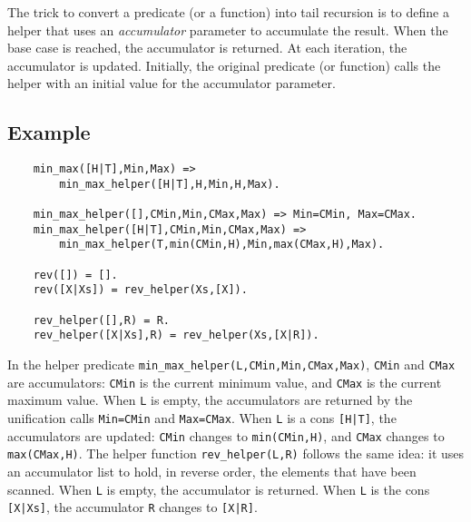 The trick to convert a predicate (or a function) into tail recursion is to define a helper that uses an \emph{accumulator} parameter to accumulate the result. When the base case is reached, the accumulator is returned. At each iteration, the accumulator is updated. Initially, the original predicate (or function) calls the helper with an initial value for the accumulator parameter.


\subsection*{Example}
\begin{verbatim}
    min_max([H|T],Min,Max) => 
        min_max_helper([H|T],H,Min,H,Max).

    min_max_helper([],CMin,Min,CMax,Max) => Min=CMin, Max=CMax.
    min_max_helper([H|T],CMin,Min,CMax,Max) => 
        min_max_helper(T,min(CMin,H),Min,max(CMax,H),Max).

    rev([]) = [].
    rev([X|Xs]) = rev_helper(Xs,[X]).

    rev_helper([],R) = R.
    rev_helper([X|Xs],R) = rev_helper(Xs,[X|R]).
\end{verbatim}
In the helper predicate \texttt{min\_max\_helper(L,CMin,Min,CMax,Max)}, \texttt{CMin} and \texttt{CMax} are accumulators: \texttt{CMin} is the current minimum value, and \texttt{CMax} is the current maximum value. When \texttt{L} is empty, the accumulators are returned by the unification calls \texttt{Min=CMin} and \texttt{Max=CMax}. When \texttt{L} is a cons \texttt{[H|T]}, the accumulators are updated: \texttt{CMin} changes to \texttt{min(CMin,H)}, and \texttt{CMax} changes to \texttt{max(CMax,H)}. The helper function \texttt{rev\_helper(L,R)} follows the same idea: it uses an accumulator list to hold, in reverse order, the elements that have been scanned. When \texttt{L} is empty, the accumulator is returned. When \texttt{L} is the cons \texttt{[X|Xs]}, the accumulator \texttt{R} changes to \texttt{[X|R]}.
\ignore{

}


